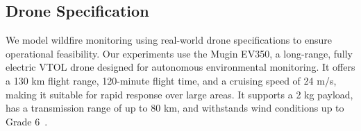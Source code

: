 \documentclass{article}
\newcommand{\danique}[1]{\textcolor{orange}{#1}}
\newcommand{\ana}[1]{\textcolor{purple}{#1}}
\begin{document}




\subsection{Drone Specification}

We model wildfire monitoring using real-world drone specifications to ensure operational feasibility. Our experiments use the Mugin EV350, a long-range, fully electric VTOL drone designed for autonomous environmental monitoring. It offers a 130 km flight range, 120-minute flight time, and a cruising speed of 24 m/s, making it suitable for rapid response over large areas. It supports a 2 kg payload, has a transmission range of up to 80 km, and withstands wind conditions up to Grade 6~\cite{mugin_ev350}.




\end{document}
